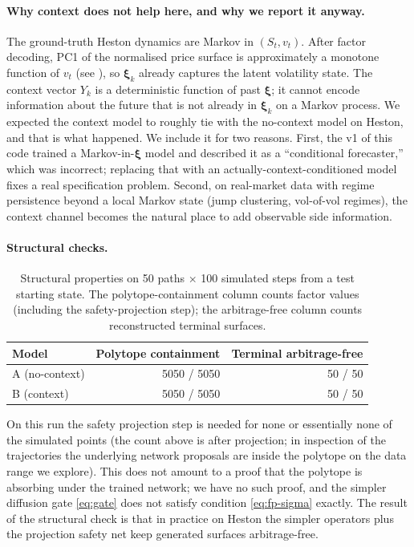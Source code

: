 \documentclass[11pt]{article}
\newcommand{\xib}{\boldsymbol{\xi}}
\newcommand{\1}{\mathbf{1}}
\begin{document}
\paragraph{Why context does not help here, and why we report it anyway.}
The ground-truth Heston dynamics are Markov in $(S_t, v_t)$. After factor decoding, PC1 of the normalised price surface is approximately a monotone function of $v_t$ (see \citet[Figure 13]{cohen2021}), so $\xib_k$ already captures the latent volatility state. The context vector $Y_k$ is a deterministic function of past $\xib$; it cannot encode information about the future that is not already in $\xib_k$ on a Markov process. We expected the context model to roughly tie with the no-context model on Heston, and that is what happened. We include it for two reasons. First, the v1 of this code trained a Markov-in-$\xib$ model and described it as a ``conditional forecaster,'' which was incorrect; replacing that with an actually-context-conditioned model fixes a real specification problem. Second, on real-market data with regime persistence beyond a local Markov state (jump clustering, vol-of-vol regimes), the context channel becomes the natural place to add observable side information.

\paragraph{Structural checks.}

\begin{table}[h]
\centering
\begin{tabular}{lrr}
\toprule
Model & Polytope containment & Terminal arbitrage-free \\
\midrule
A (no-context)   & 5050 / 5050 & 50 / 50 \\
B (context)      & 5050 / 5050 & 50 / 50 \\
\bottomrule
\end{tabular}
\caption{Structural properties on 50 paths $\times$ 100 simulated steps from a test starting state. The polytope-containment column counts factor values (including the safety-projection step); the arbitrage-free column counts reconstructed terminal surfaces.}
\label{tab:struct}
\end{table}

On this run the safety projection step is needed for none or essentially none of the simulated points (the count above is after projection; in inspection of the trajectories the underlying network proposals are inside the polytope on the data range we explore). This does not amount to a proof that the polytope is absorbing under the trained network; we have no such proof, and the simpler diffusion gate \eqref{eq:gate} does not satisfy condition \eqref{eq:fp-sigma} exactly. The result of the structural check is that in practice on Heston the simpler operators plus the projection safety net keep generated surfaces arbitrage-free.
\end{document}
